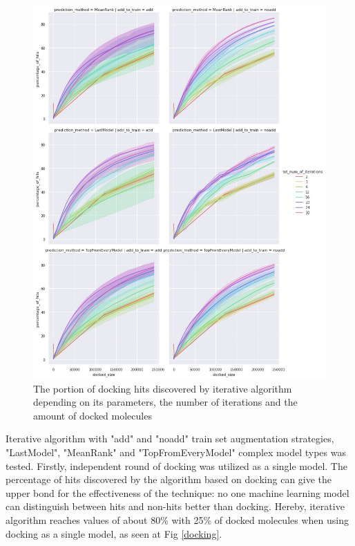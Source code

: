\begin{figure}
    \centering
    \includegraphics[width = \linewidth]{Images/LinregIterations.jpg}
    \caption{The portion of docking hits discovered by iterative algorithm depending on its parameters, the number of iterations and the amount of docked molecules}
\end{figure}

Iterative algorithm with "add" and "noadd" train set augmentation strategies, "LastModel", 
"MeanRank" and "TopFromEveryModel" complex model types was tested. 
Firstly, independent round of docking was utilized as a single model.
The percentage of hits discovered by the algorithm based on docking can give the 
upper bond for the effectiveness of the technique: no one machine learning model 
can distinguish between hits and non-hits better than docking. 
Hereby, iterative algorithm reaches values of about 80\% with 25\% of docked molecules 
when using docking as a single model, as seen at Fig \ref{docking}.\\

